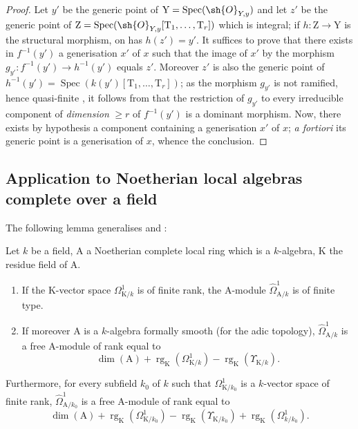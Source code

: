 \begin{proof}
Let $y'$ be the generic point of $\mathrm{Y}=\operatorname{Spec}(\sh{O}_{Y,y})$ and let $z'$ be the generic point of $\mathrm{Z}=\operatorname{Spec}(\sh{O}_{Y,y}[\mathrm{T}_1,\ldots,\mathrm{T}_r])$ which is integral; if $h:\mathrm{Z}\to\mathrm{Y}$ is the structural morphism, on has $h(z')=y'$.
It suffices to prove that there exists in $f^{-1}(y')$ a generisation $x'$ of $x$ such that the image of $x'$ by the morphism $g_{y'}:f^{-1}(y')\to h^{-1}(y')$ equals $z'$.
Moreover $z'$ is also the generic point of $h^{-1}(y')=\operatorname{Spec}(k(y')[\mathrm{T}_1,\ldots,\mathrm{T}_r])$; as the morphism $g_{y'}$ is not ramified, hence quasi-finite , it follows from  that the restriction of $g_{y'}$ to every irreducible component of \emph{dimension} $\geq r$ of $f^{-1}(y')$ is a dominant morphism.
Now, there exists by hypothesis a component containing a generisation $x'$ of $x$; \emph{a fortiori} its generic point is a generisation of $x$, whence the conclusion.
\end{proof}

\subsection{Application to Noetherian local algebras complete over a field}
\label{subsection:IV.18.11}

The following lemma generalises  and :

\begin{lemma}[18.11.1]
\label{IV.18.11.1}
Let $k$ be a field, $\mathrm{A}$ a Noetherian complete local ring which is a $k$-algebra, $\mathrm{K}$ the residue field of $\mathrm{A}$.
\begin{enumerate}[label=(\roman*)]
  \item If the $\mathrm{K}$-vector space $\Omega^1_{\mathrm{K}/k}$ is of finite rank, the $\mathrm{A}$-module $\hat{\Omega}^1_{\mathrm{A}/k}$ is of finite type.
  \item If moreover $\mathrm{A}$ is a $k$-algebra formally smooth (for the adic topology), $\hat{\Omega}^1_{\mathrm{A}/k}$ is a free $\mathrm{A}$-module of rank equal to
\[
  \dim(\mathrm{A})+\operatorname{rg}_{\mathrm{K}}(\Omega^1_{\mathrm{K}/k})-\operatorname{rg}_{\mathrm{K}}(\Upsilon_{\mathrm{K}/k}).
\]
\end{enumerate}
Furthermore, for every subfield $k_0$ of $k$ such that $\Omega^1_{\mathrm{K}/k_0}$ is a $k$-vector space of finite rank, $\hat{\Omega}^1_{\mathrm{A}/k_0}$ is a free $\mathrm{A}$-module of rank equal to
\[
  \dim(\mathrm{A})+\operatorname{rg}_{\mathrm{K}}(\Omega^1_{\mathrm{K}/k_0})-\operatorname{rg}_{\mathrm{K}}(\Upsilon_{\mathrm{K}/k_0})+\operatorname{rg}_{\mathrm{K}}(\Omega^1_{k/k_0}).
\]
\end{lemma}

